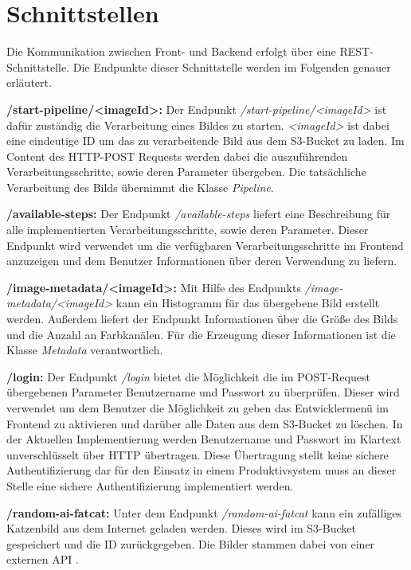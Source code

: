 \section{Schnittstellen}
\label{sec:schnittstellen}
Die Kommunikation zwischen Front- und Backend erfolgt über eine REST-Schnittstelle. Die Endpunkte dieser Schnittstelle werden im Folgenden genauer erläutert. 

\textbf{/start-pipeline/\textless imageId\textgreater: }Der Endpunkt \textit{/start-pipeline/\textless imageId\textgreater } ist dafür zuständig die Verarbeitung eines Bildes zu starten. \textit{\textless imageId\textgreater  } ist dabei eine eindeutige ID um das zu verarbeitende Bild aus dem S3-Bucket zu laden. Im Content des HTTP-POST Requests werden dabei die auszuführenden Verarbeitungsschritte, sowie deren Parameter übergeben. Die tatsächliche Verarbeitung des Bilds übernimmt die Klasse \textit{Pipeline}.

\textbf{/available-steps: }Der Endpunkt \textit{/available-steps} liefert eine Beschreibung für alle implementierten Verarbeitungsschritte, sowie deren Parameter. Dieser Endpunkt wird verwendet um die verfügbaren Verarbeitungsschritte im Frontend anzuzeigen und dem Benutzer Informationen über deren Verwendung zu liefern.

\textbf{/image-metadata/\textless imageId\textgreater: }Mit Hilfe des Endpunkts \textit{/image-metadata/\textless imageId\textgreater } kann ein Histogramm für das übergebene Bild erstellt werden. Außerdem liefert der Endpunkt Informationen über die Größe des Bilds und die Anzahl an Farbkanälen. Für die Erzeugung dieser Informationen ist die Klasse \textit{Metadata} verantwortlich.

\textbf{/login: }Der Endpunkt \textit{/login} bietet die Möglichkeit die im POST-Request übergebenen Parameter Benutzername und Passwort zu überprüfen. Dieser wird verwendet um dem Benutzer die Möglichkeit zu geben das Entwicklermenü im Frontend zu aktivieren und darüber alle Daten aus dem S3-Bucket zu löschen. In der Aktuellen Implementierung werden Benutzername und Passwort im Klartext unverschlüsselt über HTTP übertragen. Diese Übertragung stellt keine sichere Authentifizierung dar für den Einsatz in einem Produktivsystem muss an dieser Stelle eine sichere Authentifizierung implementiert werden.

\textbf{/random-ai-fatcat: }Unter dem Endpunkt \textit{/random-ai-fatcat} kann ein zufälliges Katzenbild aus dem Internet geladen werden. Dieses wird im S3-Bucket gespeichert und die ID zurückgegeben. Die Bilder stammen dabei von einer externen API \cite{catapi}. 
